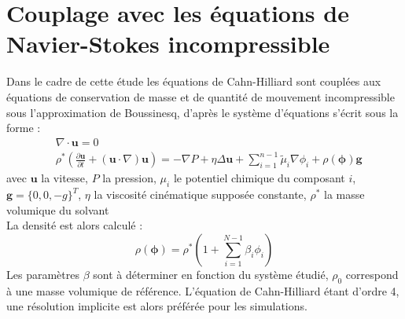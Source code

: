 \documentclass[a4paper,11pt,fleqn]{report}    %
\begin{document}
\section{Couplage avec les équations de Navier-Stokes incompressible}
Dans le cadre de cette étude les équations de Cahn-Hilliard sont couplées aux équations de conservation de masse et de quantité de mouvement incompressible sous l'approximation de Boussinesq, d'après \cite{kim_phase-field_2012} le système d'équations s'écrit sous la forme :
\begin{subequations}
\begin{align}
&\nabla \cdot \mathbf{u} = 0\\
&\rho^* \left (\frac{\partial \mathbf{u}}{\partial t} + (\mathbf{u} \cdot {\nabla})\mathbf{u}\right) = -{\nabla} P +\eta \Delta \mathbf{u}+\sum_{i=1}^{n-1} \tilde{\mu}_i{\nabla} \phi_i + \rho(\bm{\phi}) \mathbf{g}
\end{align}
\end{subequations}
avec $\mathbf{u}$ la vitesse, $P$ la pression, $\mu_i$ le potentiel chimique du composant $i$, $\mathbf{g} = \{ 0,0,-g\}^T $, $\eta$ la viscosité cinématique supposée constante, $\rho^*$ la masse volumique du solvant \\
La densité est alors calculé : 
\begin{equation}
	\rho(\bm{\phi}) = \rho^*\left(1+\sum_{i=1}^{N-1}\beta_i \phi_i\right)
\end{equation}
Les paramètres $\beta$ sont à déterminer en fonction du système étudié, $\rho_0$ correspond à une masse volumique de référence. L'équation de Cahn-Hilliard étant d'ordre 4, une résolution implicite est alors préférée pour les simulations.
\end{document}
